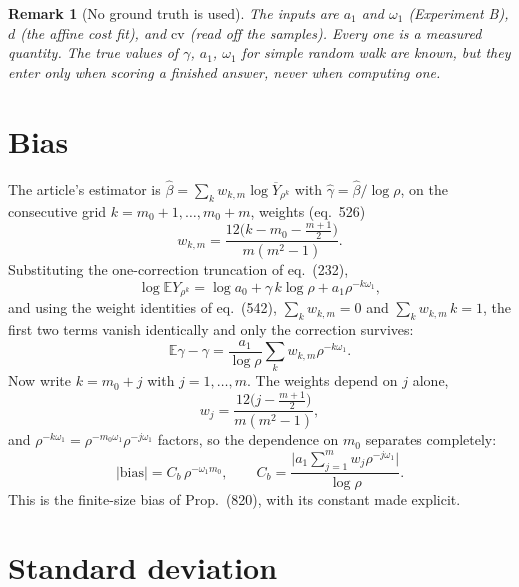 \documentclass[11pt]{article}
\newtheorem{remark}{Remark}
\newcommand{\E}{\mathbb{E}}
\newcommand{\cv}{\mathrm{cv}}
\begin{document}
\begin{remark}[No ground truth is used]
The inputs are $a_1$ and $\omega_1$ (Experiment B), $d$ (the affine cost fit),
and $\cv$ (read off the samples). Every one is a measured quantity. The true
values of $\gamma$, $a_1$, $\omega_1$ for simple random walk are known, but
they enter only when \emph{scoring} a finished answer, never when computing
one.
\end{remark}

\section{Bias}

The article's estimator is $\hat\beta=\sum_k w_{k,m}\log\overline Y_{\rho^k}$
with $\hat\gamma=\hat\beta/\log\rho$, on the consecutive grid
$k=m_0+1,\dots,m_0+m$, weights (eq.~526)
\begin{equation}
  w_{k,m}=\frac{12\bigl(k-m_0-\tfrac{m+1}{2}\bigr)}{m(m^2-1)} .
\end{equation}
Substituting the one-correction truncation of eq.~(232),
\begin{equation}
  \log\E Y_{\rho^k}=\log a_0+\gamma\, k\log\rho+a_1\rho^{-k\omega_1},
\end{equation}
and using the weight identities of eq.~(542), $\sum_k w_{k,m}=0$ and
$\sum_k w_{k,m}\,k=1$, the first two terms vanish identically and only the
correction survives:
\begin{equation}
  \E\hat\gamma-\gamma=\frac{a_1}{\log\rho}\sum_k w_{k,m}\rho^{-k\omega_1}.
\end{equation}
Now write $k=m_0+j$ with $j=1,\dots,m$. The weights depend on $j$ alone,
\begin{equation}
  w_j=\frac{12\bigl(j-\tfrac{m+1}{2}\bigr)}{m(m^2-1)},
\end{equation}
and $\rho^{-k\omega_1}=\rho^{-m_0\omega_1}\rho^{-j\omega_1}$ factors, so the
dependence on $m_0$ separates completely:
\begin{equation}
  \boxed{\;
  \lvert\text{bias}\rvert=C_b\,\rho^{-\omega_1 m_0},
  \qquad
  C_b=\frac{\bigl\lvert a_1\sum_{j=1}^{m}w_j\rho^{-j\omega_1}\bigr\rvert}{\log\rho}.
  \;}
  \label{eq:Cb}
\end{equation}
This is the finite-size bias of Prop.~(820), with its constant made explicit.

\section{Standard deviation}
\end{document}

